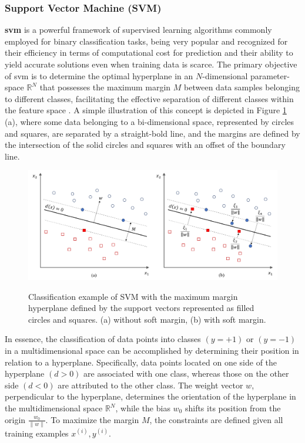 \subsubsection{Support Vector Machine (SVM)}
\label{subsubsec:machine_learning_svm}

\textbf{\gls{svm}} is a powerful framework of supervised learning algorithms commonly employed for binary classification tasks, being very popular and recognized for their efficiency in terms of computational cost for prediction and their ability to yield accurate solutions even when training data is scarce. The primary objective of \gls{svm} is to determine the optimal hyperplane in an $N$-dimensional parameter-space $\mathbb{R}^N$ that possesses the maximum margin $M$ between data samples belonging to different classes, facilitating the effective separation of different classes within the feature space \cite{Russel2010}. A simple illustration of this concept is depicted in Figure \ref{fig:frmwk_machine_learning_svm} (a), where some data belonging to a bi-dimensional space, represented by circles and squares, are separated by a straight-bold line, and the margins are defined by the intersection of the solid circles and squares with an offset of the boundary line.

\begin{figure}[htbp]
    \raggedright
        \caption{Classification example of SVM with the maximum margin hyperplane defined by the support vectors represented as filled circles and squares. (a) without soft margin, (b) with soft margin.}
        \includegraphics[width=1.0\textwidth]{resources/images/030-theoretical_framework/Framework_machine_learning_SVM.png}
        \label{fig:frmwk_machine_learning_svm}
\end{figure}

In essence, the classification of data points into classes $(y = +1)$ or $(y = -1)$ in a multidimensional space can be accomplished by determining their position in relation to a hyperplane. Specifically, data points located on one side of the hyperplane $(d > 0)$ are associated with one class, whereas those on the other side $(d < 0)$ are attributed to the other class. The weight vector $w$, perpendicular to the hyperplane, determines the orientation of the hyperplane in the multidimensional space $\mathbb{R}^N$, while the bias $w_0$ shifts its position from the origin $\frac{w_0}{\parallel w \parallel}$. To maximize the margin $M$, the constraints are defined given all training examples {$x^{(i)}, y^{(i)}$}.

